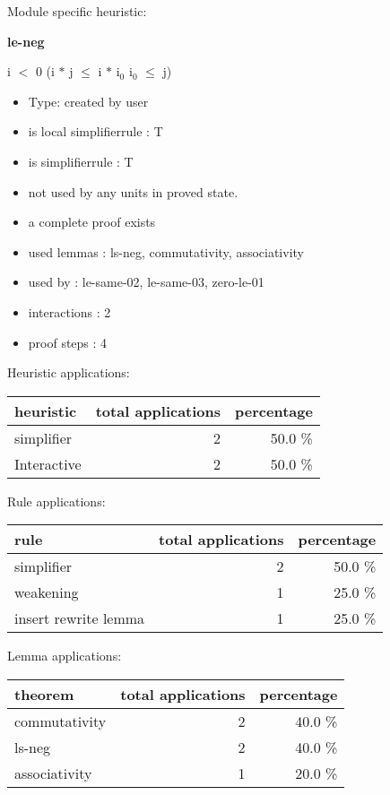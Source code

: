 \documentclass[a4paper]{article}
\begin{document}
Module specific heuristic:

\pagebreak

{\LARGE\bf le-neg}\label{lemma-le-neg}

\medskip

 \Fol i $<$ 0 \Imp (i $*$ j $\le$ i $*$ $\mbox{i}_{0}$ \Equiv $\mbox{i}_{0}$ $\le$ j)

\begin{itemize}

\item Type: created by user

\item is local simplifierrule : T
\item is simplifierrule : T
\item not used by any units in proved state.
\item       a complete proof exists
\item       used lemmas  : ls-neg, commutativity, associativity
\item       used by      : le-same-02, le-same-03, zero-le-01
\item       interactions : 2
\item       proof steps  : 4
\end{itemize}

\medskip


Heuristic applications:

\begin{supertabular}{l|r|r}
heuristic	& total applications & percentage \\ \hline
simplifier & 2 & 50.0 \% \\
Interactive & 2 & 50.0 \% \\

\end{supertabular}

Rule applications:

\begin{supertabular}{l|r|r}
rule	        & total applications & percentage \\ \hline
simplifier & 2 & 50.0 \% \\
weakening & 1 & 25.0 \% \\
insert rewrite lemma & 1 & 25.0 \% \\

\end{supertabular}

Lemma applications:

\begin{supertabular}{l|r|r}
theorem	        & total applications & percentage \\ \hline
commutativity & 2 & 40.0 \% \\
ls-neg & 2 & 40.0 \% \\
associativity & 1 & 20.0 \% \\

\end{supertabular}
\end{document}
